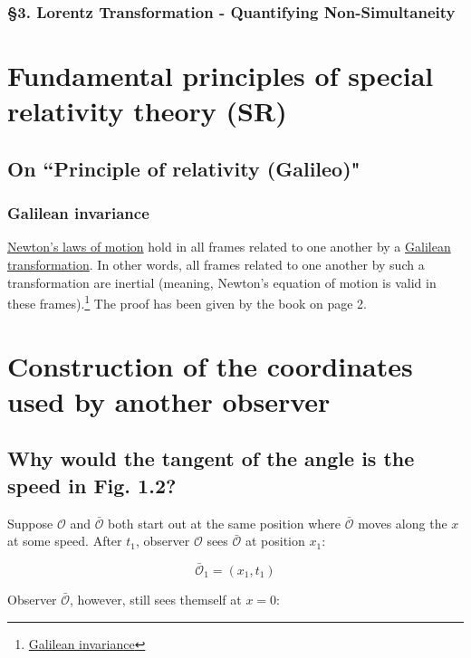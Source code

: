 \subsubsection{\hfil \S3. Lorentz Transformation - Quantifying Non-Simultaneity \hfil}

\section{Fundamental principles of special relativity theory (SR)}

\subsection{On ``Principle of relativity (Galileo)"}

\subsubsection{Galilean invariance}

\href{https://en.wikipedia.org/wiki/Newton\%27s_laws_of_motion}{Newton's laws of motion} hold in all frames related
to one another by a \href{https://en.wikipedia.org/wiki/Galilean\_transformation}{Galilean transformation}. In
other words, all frames related to one another by such a transformation are inertial (meaning, Newton's equation of
motion is valid in these frames).\footnote{\href{https://en.wikipedia.org/wiki/Galilean_invariance}{Galilean invariance}}
The proof has been given by the book on page 2.

\section{Construction of the coordinates used by another observer}

\subsection{Why would the tangent of the angle is the speed in Fig. 1.2?}

Suppose $\mathcal{O}$ and $\mathcal{\bar{O}}$ both start out at the same position where $\mathcal{\bar{O}}$
moves along the $x$ at some speed. After $t_1$, observer $\mathcal{O}$ sees $\mathcal{\bar{O}}$ at position $x_1$:

\[ \mathcal{\bar{O}}_1 = (x_1, t_1) \]

Observer  $\mathcal{\bar{O}}$, however, still sees themself at $x = 0$:

